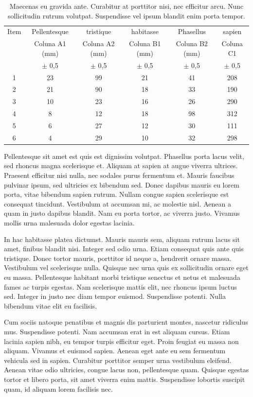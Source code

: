 \documentclass[%
a4paper, %
twocolumn, %
10pt %
]{article}
\begin{document}
\begin{table}[htb]
\centering
\begin{tabular}{c c c c c c} \hline \hline
Item & Pellentesque & tristique &  habitasse & Phasellus & sapien\\
     & Coluna A1 (mm) & Coluna A2 (mm) & Coluna B1 (mm) & Coluna B2 (mm) & Coluna C1 \\
 & $\pm$ 0,5 & $\pm$ 0,5 & $\pm$ 0,5 & $\pm$ 0,5 & $\pm$ 0,5  \\ \hline
1 & 23 & 99 & 21 & 41 & 208 \\
2 & 21 & 90 & 18 & 33 & 190 \\
3 & 10 & 23 & 16 & 26 & 290 \\ 
4 & 8 &  12 & 18 & 98 & 312 \\
5 & 6 & 27 & 12 & 30 & 111 \\ 
6 & 4 & 29 & 10 & 32 & 298 \\ \hline \hline
\end{tabular}
\caption{\label{tabela2}Maecenas eu gravida ante. Curabitur at porttitor nisi, nec efficitur arcu. Nunc sollicitudin rutrum volutpat. Suspendisse vel ipsum blandit enim porta tempor.}
\end{table}

Pellentesque sit amet est quis est dignissim volutpat. Phasellus porta lacus velit, sed rhoncus magna scelerisque et. Aliquam at sapien at augue viverra ultrices. Praesent efficitur nisi nulla, nec sodales purus fermentum et. Mauris faucibus pulvinar ipsum, sed ultricies ex bibendum sed. Donec dapibus mauris eu lorem porta, vitae bibendum sapien rutrum. Nullam congue sapien scelerisque est consequat tincidunt. Vestibulum at accumsan mi, ac molestie nisl. Aenean a quam in justo dapibus blandit. Nam eu porta tortor, ac viverra justo. Vivamus mollis urna malesuada dolor egestas lacinia.

In hac habitasse platea dictumst. Mauris mauris sem, aliquam rutrum lacus sit amet, finibus blandit nisi. Integer sed odio urna. Etiam consequat quis ante quis tristique. Donec tortor mauris, porttitor id neque a, hendrerit ornare massa. Vestibulum vel scelerisque nulla. Quisque nec urna quis ex sollicitudin ornare eget eu massa. Pellentesque habitant morbi tristique senectus et netus et malesuada fames ac turpis egestas. Nam scelerisque mattis elit, nec rhoncus ipsum luctus sed. Integer in justo nec diam tempor euismod. Suspendisse potenti. Nulla bibendum vitae elit eu facilisis.

Cum sociis natoque penatibus et magnis dis parturient montes, nascetur ridiculus mus. Suspendisse potenti. Nam accumsan erat in est aliquam cursus. Etiam lacinia sapien nibh, eu tempor turpis efficitur eget. Proin feugiat eu massa non aliquam. Vivamus et euismod sapien. Aenean eget ante eu sem fermentum vehicula sed in sapien. Curabitur porttitor semper urna vestibulum eleifend. Aenean vitae odio ultricies, congue lacus non, pellentesque quam. Quisque egestas tortor et libero porta, sit amet viverra enim mattis. Suspendisse lobortis suscipit quam, id aliquam lorem facilisis nec. 
\end{document}
